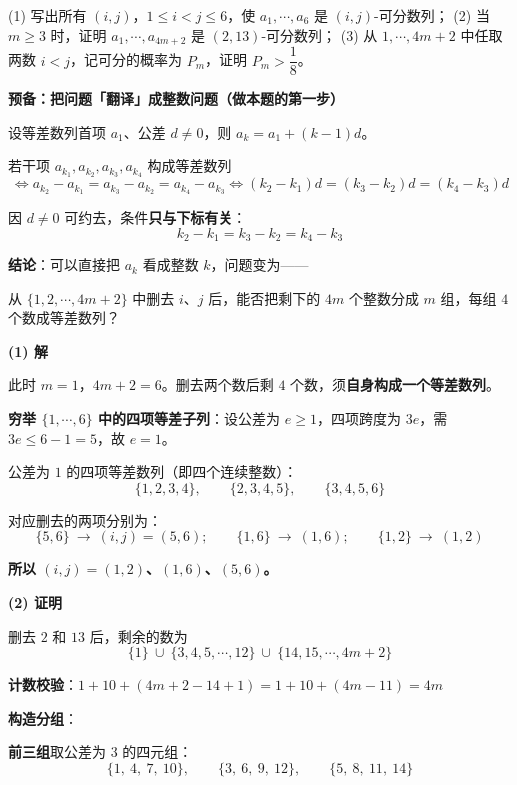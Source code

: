   (1) 写出所有 $(i,j)$，$1\le i<j\le6$，使 $a_1,\cdots,a_6$ 是 $(i,j)$-可分数列；
  (2) 当 $m\ge3$ 时，证明 $a_1,\cdots,a_{4m+2}$ 是 $(2,13)$-可分数列；
  (3) 从 $1,\cdots,4m+2$ 中任取两数 $i<j$，记可分的概率为 $P_m$，证明 $P_m>\dfrac18$。

\par\medskip

\textbf{预备：把问题「翻译」成整数问题（做本题的第一步）}

设等差数列首项 $a_1$、公差 $d\ne0$，则 $a_k=a_1+(k-1)d$。

若干项 $a_{k_1},a_{k_2},a_{k_3},a_{k_4}$ 构成等差数列
\[\iff a_{k_2}-a_{k_1}=a_{k_3}-a_{k_2}=a_{k_4}-a_{k_3}\iff \left(k_2-k_1\right)d=\left(k_3-k_2\right)d=\left(k_4-k_3\right)d\]

因 $d\ne0$ 可约去，条件\textbf{只与下标有关}：
\[k_2-k_1=k_3-k_2=k_4-k_3\]

\textbf{结论}：可以直接把 $a_k$ 看成整数 $k$，问题变为——

\begin{gktip}
从 $\{1,2,\cdots,4m+2\}$ 中删去 $i$、$j$ 后，能否把剩下的 $4m$ 个整数分成 $m$ 组，每组 $4$ 个数成等差数列？
\end{gktip}

\par\medskip

\textbf{(1) 解}

此时 $m=1$，$4m+2=6$。删去两个数后剩 $4$ 个数，须\textbf{自身构成一个等差数列}。

\textbf{穷举 $\{1,\cdots,6\}$ 中的四项等差子列}：设公差为 $e\ge1$，四项跨度为 $3e$，需 $3e\le6-1=5$，故 $e=1$。

公差为 $1$ 的四项等差数列（即四个连续整数）：
\[\{1,2,3,4\},\qquad\{2,3,4,5\},\qquad\{3,4,5,6\}\]

对应删去的两项分别为：
\[\{5,6\}\ \to\ (i,j)=(5,6);\qquad \{1,6\}\ \to\ (1,6);\qquad \{1,2\}\ \to\ (1,2)\]

\textbf{所以 $(i,j)=(1,2)$、$(1,6)$、$(5,6)$。}

\par\medskip

\textbf{(2) 证明}

删去 $2$ 和 $13$ 后，剩余的数为
\[\{1\}\ \cup\ \{3,4,5,\cdots,12\}\ \cup\ \{14,15,\cdots,4m+2\}\]

\textbf{计数校验}：$1+10+\left(4m+2-14+1\right)=1+10+(4m-11)=4m$ 

\textbf{构造分组}：

\textbf{前三组}取公差为 $3$ 的四元组：
\[\{1,\ 4,\ 7,\ 10\},\qquad\{3,\ 6,\ 9,\ 12\},\qquad\{5,\ 8,\ 11,\ 14\}\]

